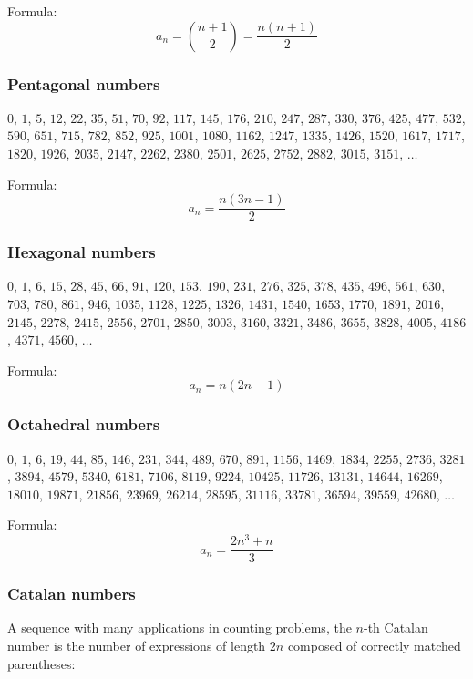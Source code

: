 \documentclass[a4paper,12pt]{article}
\begin{document}
\noindent Formula:
\[a_n={{n+1}\choose 2}=\frac{n(n+1)}{2}\]

\subsubsection{Pentagonal numbers}

\begin{center}$0$, $1$, $5$, $12$, $22$, $35$, $51$, $70$, $92$, $117$, $145$, $176$, $210$, $247$, $287$, $330$, $376$, $425$, $477$, $532$, $590$, $651$, $715$, $782$, $852$, $925$, $1001$, $1080$, $1162$, $1247$, $1335$, $1426$, $1520$, $1617$, $1717$, $1820$, $1926$, $2035$, $2147$, $2262$, $2380$, $2501$, $2625$, $2752$, $2882$, $3015$, $3151$, $\ldots$\end{center}

\noindent Formula:
\[a_n=\frac{n(3n-1)}{2}\]

\subsubsection{Hexagonal numbers}

\begin{center}$0$, $1$, $6$, $15$, $28$, $45$, $66$, $91$, $120$, $153$, $190$, $231$, $276$, $325$, $378$, $435$, $496$, $561$, $630$, $703$, $780$, $861$, $946$, $1035$, $1128$, $1225$, $1326$, $1431$, $1540$, $1653$, $1770$, $1891$, $2016$, $2145$, $2278$, $2415$, $2556$, $2701$, $2850$, $3003$, $3160$, $3321$, $3486$, $3655$, $3828$, $4005$, $4186$, $4371$, $4560$, $\ldots$\end{center}

\noindent Formula:
\[a_n=n(2n-1)\]

\subsubsection{Octahedral numbers}

\begin{center}$0$, $1$, $6$, $19$, $44$, $85$, $146$, $231$, $344$, $489$, $670$, $891$, $1156$, $1469$, $1834$, $2255$, $2736$, $3281$, $3894$, $4579$, $5340$, $6181$, $7106$, $8119$, $9224$, $10425$, $11726$, $13131$, $14644$, $16269$, $18010$, $19871$, $21856$, $23969$, $26214$, $28595$, $31116$, $33781$, $36594$, $39559$, $42680$, $\ldots$\end{center}

\noindent Formula:
\[a_n=\frac{2n^3 + n}{3}\]

\subsubsection{Catalan numbers}
A sequence with many applications in counting problems, the $n$-th Catalan number is the number of expressions of length $2n$ composed of correctly matched parentheses:
\end{document}

